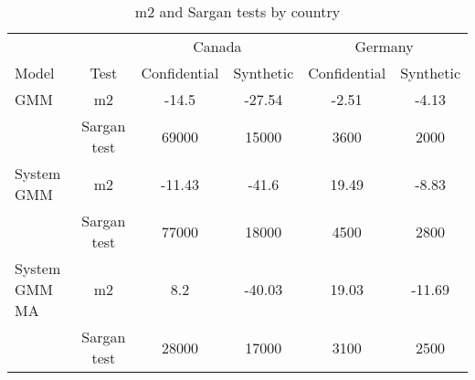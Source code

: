
\begin{table}[!htbp] \centering 
  \caption{m2 and Sargan tests by country} 
  \label{tab:m2sargan} 
\begin{tabular}{@{\extracolsep{5pt}} lccccc} 
\\[-1.8ex]
\toprule
      &      &\multicolumn{2}{c}{Canada}&\multicolumn{2}{c}{Germany}\\
Model & Test & Confidential & Synthetic & Confidential & Synthetic \\ 
\toprule
GMM & m2 & -14.5 & -27.54 & -2.51 & -4.13 \\ 
    & Sargan test & 69000 & 15000 & 3600 & 2000 \\ 
    \midrule
System GMM & m2 & -11.43 & -41.6 & 19.49 & -8.83 \\ 
           & Sargan test & 77000 & 18000 & 4500 & 2800 \\ 
           \midrule
System GMM MA & m2 & 8.2 & -40.03 & 19.03 & -11.69 \\ 
              & Sargan test & 28000 & 17000 & 3100 & 2500 \\ 
\bottomrule
\end{tabular} 
\end{table} 
